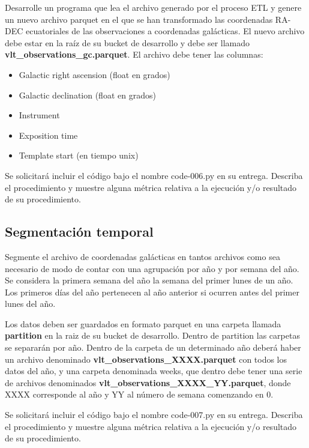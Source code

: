 \documentclass[12pt,letterpaper,twoside]{article}
\begin{document}
{\color{red} Desarrolle un programa que lea el archivo generado por el proceso ETL y genere un nuevo archivo parquet en el que se han transformado las coordenadas RA-DEC ecuatoriales de las observaciones a coordenadas galácticas. El nuevo archivo debe estar en la raíz de su bucket de desarrollo y debe ser llamado \textbf{vlt\_observations\_gc.parquet}. El archivo debe tener las columnas:
    \begin{itemize}
        \item Galactic right ascension (float en grados)
        \item Galactic declination (float en grados)
        \item Instrument
        \item Exposition time
        \item Template start (en tiempo unix)
    \end{itemize}
    Se solicitará incluir el código bajo el nombre code-006.py en su entrega. Describa el procedimiento y muestre alguna métrica relativa a la ejecución y/o resultado de su procedimiento.}

\begin{code}[H]
    
\end{code}

\subsection{Segmentación temporal}

{\color{red} Segmente el archivo de coordenadas galácticas en tantos archivos como sea necesario de modo de contar con una agrupación por año y por semana del año. Se considera la primera semana del año la semana del primer lunes de un año. Los primeros días del año pertenecen al año anterior si ocurren antes del primer lunes del año.

    Los datos deben ser guardados en formato parquet en una carpeta llamada \textbf{partition} en la raiz de su bucket de desarrollo. Dentro de partition las carpetas se separarán por año. Dentro de la carpeta de un determinado año deberá haber un archivo denominado \textbf{vlt\_observations\_XXXX.parquet} con todos los datos del año, y una carpeta denominada weeks, que dentro debe tener una serie de archivos denominados \textbf{vlt\_observations\_XXXX\_YY.parquet}, donde XXXX corresponde al año y YY al número de semana comenzando en 0.

    Se solicitará incluir el código bajo el nombre code-007.py en su entrega. Describa el procedimiento y muestre alguna métrica relativa a la ejecución y/o resultado de su procedimiento.}
\end{document}
